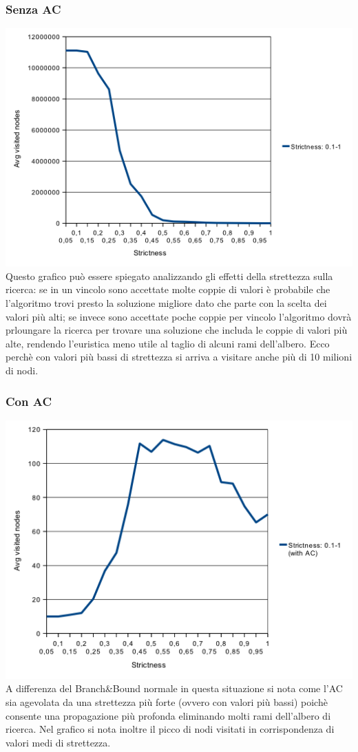 \documentclass[a4paper,12pt,italian]{article}
\begin{document}
\subsubsection{Senza AC}
\includegraphics[scale=0.8]{strict.png}
\\
Questo grafico pu\`o essere spiegato analizzando gli effetti della strettezza sulla ricerca:
se in un vincolo sono accettate molte coppie di valori \`e probabile che l'algoritmo trovi
presto la soluzione migliore dato che parte con la scelta dei valori pi\`u alti; se invece sono accettate
poche coppie per vincolo l'algoritmo dovr\`a prloungare la ricerca per trovare una soluzione
che includa le coppie di valori pi\`u alte, rendendo l'euristica meno utile al taglio di alcuni rami
dell'albero. Ecco perch\`e con valori pi\`u bassi di strettezza si arriva a visitare anche pi\`u di 10 milioni 
di nodi.

\subsubsection{Con AC}
\includegraphics[scale=0.8]{strictAC.png}
\\
A differenza del Branch\&Bound normale in questa situazione si nota come l'AC sia
agevolata da una strettezza pi\`u forte (ovvero con valori pi\`u bassi) poich\`e consente
una propagazione pi\`u profonda eliminando molti rami dell'albero di ricerca. Nel grafico si
nota inoltre il picco di nodi visitati in corrispondenza di valori medi di strettezza.
\end{document}
